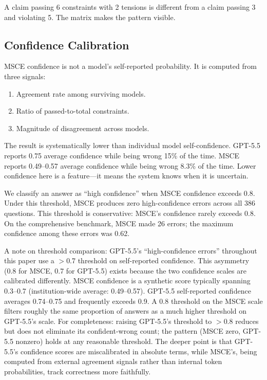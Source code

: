 \documentclass[11pt,a4paper]{article}
\begin{document}
A claim passing 6 constraints with 2 tensions is different from a claim passing 3 and violating 5. The matrix makes the pattern visible.

\subsection{Confidence Calibration}

MSCE confidence is not a model's self-reported probability. It is computed from three signals:

\begin{enumerate}
    \item Agreement rate among surviving models.
    \item Ratio of passed-to-total constraints.
    \item Magnitude of disagreement across models.
\end{enumerate}

The result is systematically lower than individual model self-confidence. GPT-5.5 reports 0.75 average confidence while being wrong 15\% of the time. MSCE reports 0.49--0.57 average confidence while being wrong 8.3\% of the time. Lower confidence here is a feature---it means the system knows when it is uncertain.

We classify an answer as ``high confidence'' when MSCE confidence exceeds 0.8. Under this threshold, MSCE produces zero high-confidence errors across all 386 questions. This threshold is conservative: MSCE's confidence rarely exceeds 0.8. On the comprehensive benchmark, MSCE made 26 errors; the maximum confidence among these errors was 0.62.

A note on threshold comparison: GPT-5.5's ``high-confidence errors'' throughout this paper use a $>$0.7 threshold on self-reported confidence. This asymmetry (0.8 for MSCE, 0.7 for GPT-5.5) exists because the two confidence scales are calibrated differently. MSCE confidence is a synthetic score typically spanning 0.3--0.7 (institution-wide average: 0.49--0.57). GPT-5.5 self-reported confidence averages 0.74--0.75 and frequently exceeds 0.9. A 0.8 threshold on the MSCE scale filters roughly the same proportion of answers as a much higher threshold on GPT-5.5's scale. For completeness: raising GPT-5.5's threshold to $>$0.8 reduces but does not eliminate its confident-wrong count; the pattern (MSCE zero, GPT-5.5 nonzero) holds at any reasonable threshold. The deeper point is that GPT-5.5's confidence scores are miscalibrated in absolute terms, while MSCE's, being computed from external agreement signals rather than internal token probabilities, track correctness more faithfully.
\end{document}
